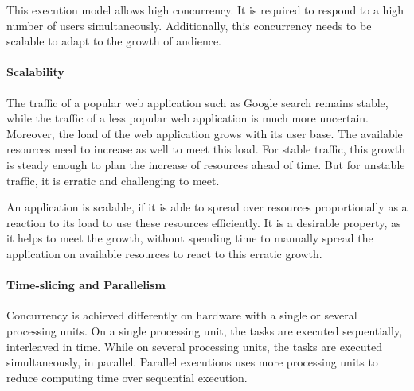 
This execution model allows high concurrency.
It is required to respond to a high number of users simultaneously.
Additionally, this concurrency needs to be scalable to adapt to the growth of audience. %

\paragraph{Scalability}

The traffic of a popular web application such as Google search remains stable, while the traffic of a less popular web application is much more uncertain.
Moreover, the load of the web application grows with its user base.
The available resources need to increase as well to meet this load.
For stable traffic, this growth is steady enough to plan the increase of resources ahead of time.
But for unstable traffic, it is erratic and challenging to meet.

An application is scalable, if it is able to spread over resources proportionally as a reaction to its load to use these resources efficiently.
It is a desirable property, as it helps to meet the growth, without spending time to manually spread the application on available resources to react to this erratic growth.

\paragraph{Time-slicing and Parallelism}

Concurrency is achieved differently on hardware with a single or several processing units.
On a single processing unit, the tasks are executed sequentially, interleaved in time.
While on several processing units, the tasks are executed simultaneously, in parallel.
Parallel executions uses more processing units to reduce computing time over sequential execution.

